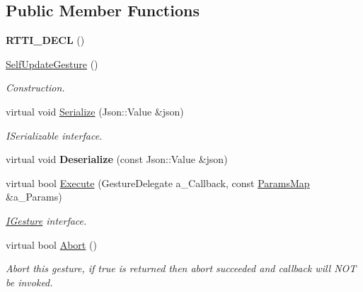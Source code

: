 \subsection*{Public Member Functions}
\begin{DoxyCompactItemize}
\item 
\mbox{\label{class_self_update_gesture_a02796fe89b422a53b6a98da574764177}} 
{\bfseries R\+T\+T\+I\+\_\+\+D\+E\+CL} ()
\item 
\mbox{\label{class_self_update_gesture_aa7e2973a7ef9efc2d50636b80a954a09}} 
\hyperlink{class_self_update_gesture_aa7e2973a7ef9efc2d50636b80a954a09}{Self\+Update\+Gesture} ()
\begin{DoxyCompactList}\small\item\em Construction. \end{DoxyCompactList}\item 
\mbox{\label{class_self_update_gesture_a80be43798c048574abe97d5823e7ce20}} 
virtual void \hyperlink{class_self_update_gesture_a80be43798c048574abe97d5823e7ce20}{Serialize} (Json\+::\+Value \&json)
\begin{DoxyCompactList}\small\item\em I\+Serializable interface. \end{DoxyCompactList}\item 
\mbox{\label{class_self_update_gesture_af1941c5aa8fefd968518ae7e00c19001}} 
virtual void {\bfseries Deserialize} (const Json\+::\+Value \&json)
\item 
\mbox{\label{class_self_update_gesture_adca477442d05fdd8ed80cdd963583ef9}} 
virtual bool \hyperlink{class_self_update_gesture_adca477442d05fdd8ed80cdd963583ef9}{Execute} (Gesture\+Delegate a\+\_\+\+Callback, const \hyperlink{class_params_map}{Params\+Map} \&a\+\_\+\+Params)
\begin{DoxyCompactList}\small\item\em \hyperlink{class_i_gesture}{I\+Gesture} interface. \end{DoxyCompactList}\item 
\mbox{\label{class_self_update_gesture_a561a4289bdc9fb6e01909d3305e3b561}} 
virtual bool \hyperlink{class_self_update_gesture_a561a4289bdc9fb6e01909d3305e3b561}{Abort} ()
\begin{DoxyCompactList}\small\item\em Abort this gesture, if true is returned then abort succeeded and callback will N\+OT be invoked. \end{DoxyCompactList}\end{DoxyCompactItemize}
